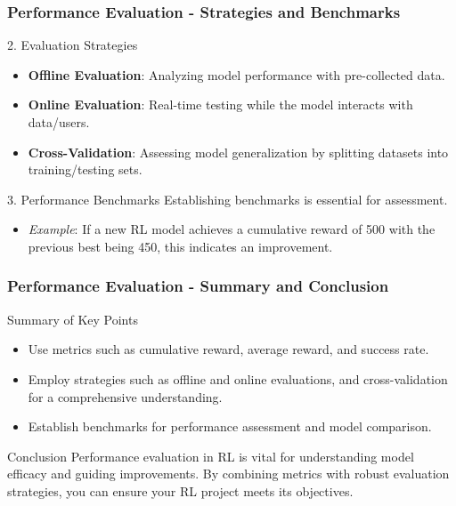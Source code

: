 \documentclass{beamer}
\begin{document}
\begin{frame}[fragile]
    \frametitle{Performance Evaluation - Strategies and Benchmarks}
    \begin{block}{2. Evaluation Strategies}
        \begin{itemize}
            \item \textbf{Offline Evaluation}: Analyzing model performance with pre-collected data.
            \item \textbf{Online Evaluation}: Real-time testing while the model interacts with data/users.
            \item \textbf{Cross-Validation}: Assessing model generalization by splitting datasets into training/testing sets.
        \end{itemize}
    \end{block}

    \begin{block}{3. Performance Benchmarks}
        Establishing benchmarks is essential for assessment.
        \begin{itemize}
            \item \textit{Example}: If a new RL model achieves a cumulative reward of 500 with the previous best being 450, this indicates an improvement.
        \end{itemize}
    \end{block}
\end{frame}

\begin{frame}[fragile]
    \frametitle{Performance Evaluation - Summary and Conclusion}
    \begin{block}{Summary of Key Points}
        \begin{itemize}
            \item Use metrics such as cumulative reward, average reward, and success rate.
            \item Employ strategies such as offline and online evaluations, and cross-validation for a comprehensive understanding.
            \item Establish benchmarks for performance assessment and model comparison.
        \end{itemize}
    \end{block}

    \begin{block}{Conclusion}
        Performance evaluation in RL is vital for understanding model efficacy and guiding improvements. By combining metrics with robust evaluation strategies, you can ensure your RL project meets its objectives.
    \end{block}
\end{frame}
\end{document}
